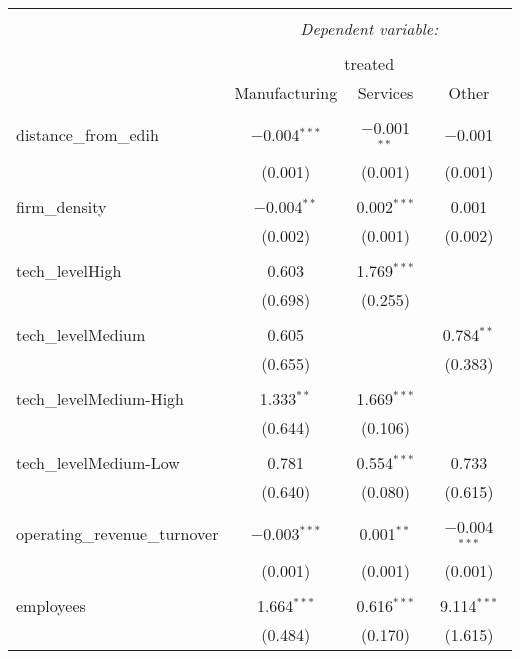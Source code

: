 
\begin{table}[!htbp] \centering 
  \caption{} 
  \label{} 
\begin{tabular}{@{\extracolsep{5pt}}lccc} 
\\[-1.8ex]\hline 
\hline \\[-1.8ex] 
 & \multicolumn{3}{c}{\textit{Dependent variable:}} \\ 
\cline{2-4} 
\\[-1.8ex] & \multicolumn{3}{c}{treated} \\ 
 & Manufacturing & Services & Other \\ 
\hline \\[-1.8ex] 
 distance\_from\_edih & $-$0.004$^{***}$ & $-$0.001$^{**}$ & $-$0.001 \\ 
  & (0.001) & (0.001) & (0.001) \\ 
  & & & \\ 
 firm\_density & $-$0.004$^{**}$ & 0.002$^{***}$ & 0.001 \\ 
  & (0.002) & (0.001) & (0.002) \\ 
  & & & \\ 
 tech\_levelHigh & 0.603 & 1.769$^{***}$ &  \\ 
  & (0.698) & (0.255) &  \\ 
  & & & \\ 
 tech\_levelMedium & 0.605 &  & 0.784$^{**}$ \\ 
  & (0.655) &  & (0.383) \\ 
  & & & \\ 
 tech\_levelMedium-High & 1.333$^{**}$ & 1.669$^{***}$ &  \\ 
  & (0.644) & (0.106) &  \\ 
  & & & \\ 
 tech\_levelMedium-Low & 0.781 & 0.554$^{***}$ & 0.733 \\ 
  & (0.640) & (0.080) & (0.615) \\ 
  & & & \\ 
 operating\_revenue\_turnover & $-$0.003$^{***}$ & 0.001$^{**}$ & $-$0.004$^{***}$ \\ 
  & (0.001) & (0.001) & (0.001) \\ 
  & & & \\ 
 employees & 1.664$^{***}$ & 0.616$^{***}$ & 9.114$^{***}$ \\ 
  & (0.484) & (0.170) & (1.615) \\ 

\end{tabular}
\end{table}
